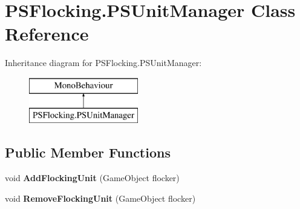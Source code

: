 \hypertarget{class_p_s_flocking_1_1_p_s_unit_manager}{}\section{P\+S\+Flocking.\+P\+S\+Unit\+Manager Class Reference}
\label{class_p_s_flocking_1_1_p_s_unit_manager}
Inheritance diagram for P\+S\+Flocking.\+P\+S\+Unit\+Manager\+:\begin{figure}[H]
\begin{center}
\leavevmode
\includegraphics[height=2.000000cm]{class_p_s_flocking_1_1_p_s_unit_manager}
\end{center}
\end{figure}
\subsection*{Public Member Functions}
\begin{DoxyCompactItemize}
\item 
\mbox{\label{class_p_s_flocking_1_1_p_s_unit_manager_a7781ba028d37cfe03fd3c540869751aa}} 
void {\bfseries Add\+Flocking\+Unit} (Game\+Object flocker)
\item 
\mbox{\label{class_p_s_flocking_1_1_p_s_unit_manager_af7ec7299b52dc9206629f92dcfb601d2}} 
void {\bfseries Remove\+Flocking\+Unit} (Game\+Object flocker)
\end{DoxyCompactItemize}
